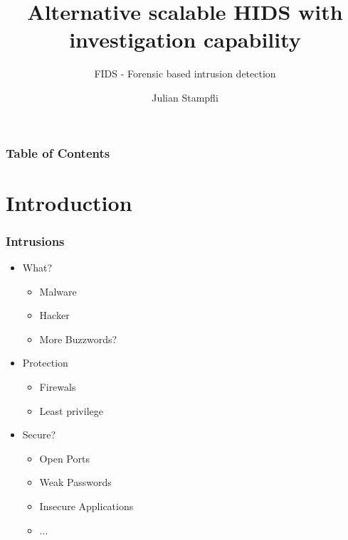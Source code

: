 \documentclass{beamer}
\begin{document}
\title{Alternative scalable HIDS with investigation capability}
\subtitle{FIDS - Forensic based intrusion detection}
\author{Julian Stampfli}

\frame{\titlepage}


\begin{frame}
  \frametitle{Table of Contents}
  \tableofcontents
\end{frame}

\section{Introduction}

\begin{frame}[fragile]
  \frametitle{Intrusions}
  \begin{itemize}
    \item What?
    \begin{itemize}
      \item Malware
      \item Hacker
      \item More Buzzwords?
    \end{itemize}
    \pause
    \item Protection 
    \begin{itemize}
      \item Firewals
      \item Least privilege
    \end{itemize}

    \item Secure\pause ?
    \begin{itemize}
      \item Open Ports
      \item Weak Passwords
      \item Insecure Applications
      \item ...
    \end{itemize}
  \end{itemize}
\end{frame}
\end{document}
